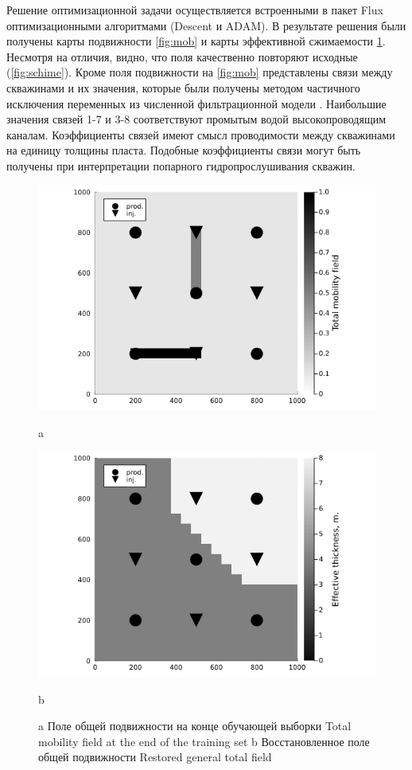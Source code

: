 \documentclass{article}
\begin{document}
Решение оптимизационной задачи осуществляется встроенными в пакет Flux оптимизационными алгоритмами (Descent и ADAM). В результате решения были получены карты подвижности \ref{fig:mob} и карты эффективной сжимаемости \ref{comp}. Несмотря на отличия, видно, что поля качественно повторяют исходные (\ref{fig:schime}). Кроме поля подвижности на \ref{fig:mob} представлены связи между скважинами и их значения, которые были получены методом частичного исключения переменных из численной фильтрационной модели \cite{and}. Наибольшие значения связей 1-7 и 3-8 соответствуют промытым водой высокопроводящим каналам. Коэффициенты связей имеют смысл проводимости между скважинами на единицу толщины пласта. Подобные коэффициенты связи могут быть получены при интерпретации попарного гидропрослушивания скважин.

\begin{figure}
	\centering
	\begin{minipage}{0.5\linewidth}
		\includegraphics[width=1\textwidth]{fig4}
		\caption{a}
		\label{fig:mob}
	\end{minipage}%
	\begin{minipage}{0.5\linewidth}
		\centering
		\includegraphics[width=1\textwidth]{fig5}
		\caption{b}
		\label{comp}
	\end{minipage}
	\caption{a Поле общей подвижности на конце обучающей выборки Total mobility field at the end of the training set
	b Восстановленное поле общей подвижности Restored general total field}
\end{figure}
\end{document}
